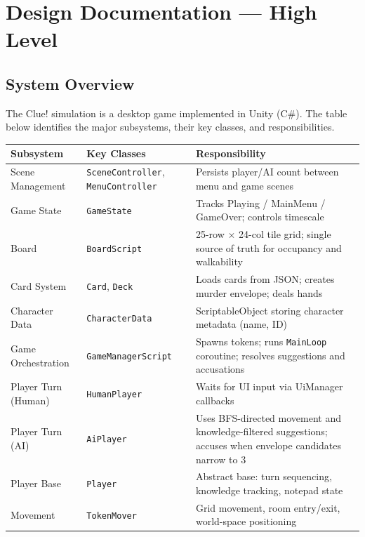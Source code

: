 \chapter{Design Documentation --- High Level}
\label{chap:design-high}

\section{System Overview}

The Clue! simulation is a desktop game implemented in Unity (C\#). The table below identifies the major subsystems, their key classes, and responsibilities.

\begin{table}[H]
\centering
\footnotesize
\setlength{\tabcolsep}{5pt}
\begin{tabular}{|p{2.5cm}|p{2.8cm}|p{5.5cm}|}
\hline
\textbf{Subsystem} & \textbf{Key Classes} & \textbf{Responsibility} \\ \hline
Scene Management & \texttt{SceneController}, \texttt{MenuController} & Persists player/AI count between menu and game scenes \\ \hline
Game State & \texttt{GameState} & Tracks Playing / MainMenu / GameOver; controls timescale \\ \hline
Board & \texttt{BoardScript} & 25-row $\times$ 24-col tile grid; single source of truth for occupancy and walkability \\ \hline
Card System & \texttt{Card}, \texttt{Deck} & Loads cards from JSON; creates murder envelope; deals hands \\ \hline
Character Data & \texttt{CharacterData} & ScriptableObject storing character metadata (name, ID) \\ \hline
Game Orchestration & \texttt{GameManagerScript} & Spawns tokens; runs \texttt{MainLoop} coroutine; resolves suggestions and accusations \\ \hline
Player Turn (Human) & \texttt{HumanPlayer} & Waits for UI input via UiManager callbacks \\ \hline
Player Turn (AI) & \texttt{AiPlayer} & Uses BFS-directed movement and knowledge-filtered suggestions; accuses when envelope candidates narrow to 3 \\ \hline
Player Base & \texttt{Player} & Abstract base: turn sequencing, knowledge tracking, notepad state \\ \hline
Movement & \texttt{TokenMover} & Grid movement, room entry/exit, world-space positioning \\ \hline

\end{tabular}
\end{table}
